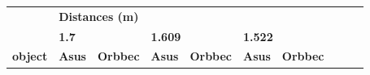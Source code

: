\documentclass[a4paper, 12pt]{book}
\begin{document}
\begin{table}[H]
\centering
\setlength\tabcolsep{2pt}
\begin{tabular}{c|lllllllll}
\cline{1-7}
\multicolumn{1}{|l|}{}   & 
\multicolumn{6}{l|}{\textbf{\hspace{3cm} Distances (m)}}    \\
\cline{1-7}
\multicolumn{1}{|l|}{\textbf{}}   & 
\multicolumn{2}{l|}{\textbf{1.7 }} & 
\multicolumn{2}{l|}{\textbf{1.609}} & 
\multicolumn{2}{l|}{\textbf{1.522}} &  \\

\cline{1-7}
\multicolumn{1}{|l|}{\textbf{object}}   & 
\multicolumn{1}{l|}{\textbf{Asus }} & 
\multicolumn{1}{l|}{\textbf{Orbbec}} & 
\multicolumn{1}{l|}{\textbf{Asus}} &  
\multicolumn{1}{l|}{\textbf{Orbbec }} & 
\multicolumn{1}{l|}{\textbf{Asus}} & 
\multicolumn{1}{l|}{\textbf{Orbbec}} & \\


\end{tabular}
\end{table}
\end{document}
